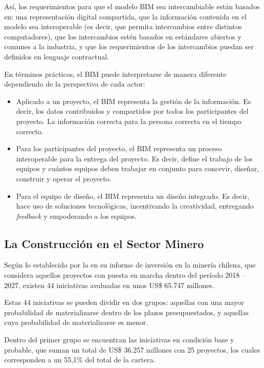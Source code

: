 Así, los requerimientos para que el modelo BIM sea intercambiable están basados en: una representación digital compartida, que la información contenida en el modelo sea interoperable (es decir, que permita intercambios entre distintos computadores), que los intercambios estén basados en estándares abiertos y comunes a la industria, y que los requerimientos de los intercambios puedan ser definidos en lenguaje contractual. %

En términos prácticos, el BIM puede interpretarse de manera diferente dependiendo de la perspectiva de cada actor:

\begin{itemize}
    \item Aplicado a un proyecto, el BIM representa la gestión de la información. Es decir, los datos contribuidos y compartidos por todos los participantes del proyecto. La información correcta para la persona correcta en el tiempo correcto.
    \item Para los participantes del proyecto, el BIM representa un proceso interoperable para la entrega del proyecto. Es decir, define el trabajo de los equipos y cuántos equipos deben trabajar en conjunto para concevir, diseñar, construir y operar el proyecto.
    \item Para el equipo de diseño, el BIM representa un diseño integrado. Es decir, hace uso de soluciones tecnológicas, incentivando la creatividad, entregando \emph{feedback} y empoderando a los equipos.
\end{itemize}

\subsection{La Construcción en el Sector Minero}

Según lo establecido por la  en su informe de inversión en la minería chilena, que considera aquellos proyectos con puesta en marcha dentro del período 2018 -- 2027, existen 44 iniciativas avaluadas en unos US\$ 65.747 millones.

Estas 44 iniciativas se pueden dividir en dos grupos: aquellas con una mayor probabilidad de materializarse dentro de los plazos presupuestados, y aquellas cuya probabilidad de materializarse es menor.

Dentro del primer grupo se encuentran las iniciativas en condición base y probable, que suman un total de US\$ 36.257 millones con 25 proyectos, los cuales corresponden a un 55,1\% del total de la cartera.

